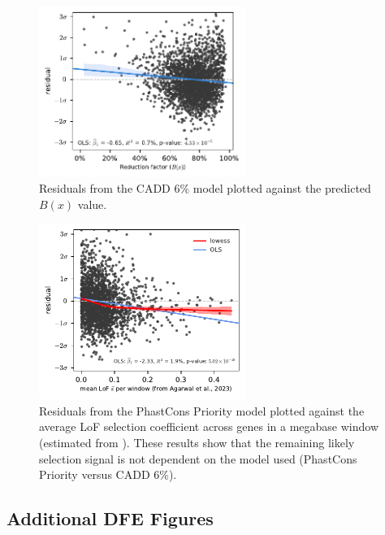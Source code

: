 \documentclass[11pt]{article}
\begin{document}
\begin{figure}[htbp]
  \centering
  \includegraphics[width=0.6\textwidth]{figures/supplementary/b_resid.pdf}
  \caption{Residuals from the CADD 6\% model plotted against the predicted $B(x)$
           value.}
  \label{suppfig:resid-b}
\end{figure}

\begin{figure}[htbp]
  \centering
  \includegraphics[width=0.6\textwidth]{figures/supplementary/phastcons_resid_lof.pdf}
  \caption{Residuals from the PhastCons Priority model plotted against the
  average LoF selection coefficient across genes in a megabase window
(estimated from \cite{Agarwal2023-un}). These results show that the remaining likely 
selection signal is not dependent on the model used (PhastCons Priority versus CADD 6\%).}
  \label{suppfig:resid-pc-fit}
\end{figure}

\subsection{Additional DFE Figures}
\end{document}
